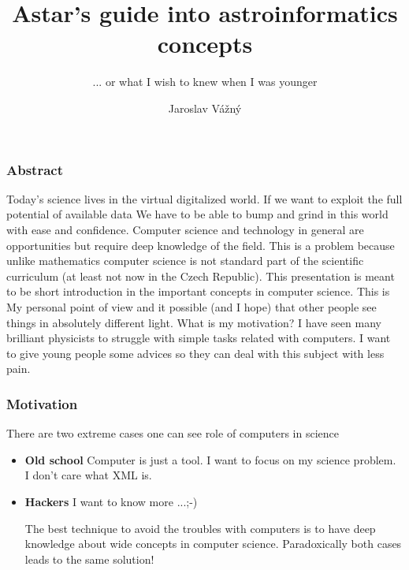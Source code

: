 \documentclass[fleqn]{beamer}
\title[VO \& Data Mining] %
{Astar's  guide into astroinformatics concepts}
\subtitle{... or what I wish to knew when I was younger} %
\author[Jaroslav Vážný] %
{Jaroslav Vážný }
\institute[Universities of Somewhere and Elsewhere] %
{

    Masarykova univerzita

}
\begin{document}
 




\begin{frame}
  \titlepage
\end{frame}




\begin{frame}\frametitle{Abstract}
\small{Today's science lives in the virtual digitalized world. If we
  want to exploit the full potential of available data We have to be
  able to bump and grind in this world with ease and confidence.
  Computer science and technology in general are opportunities but
  require deep knowledge of the field.  This is a problem because
  unlike mathematics computer science is not standard part of the
  scientific curriculum (at least not now in the Czech Republic). This
  presentation is meant to be short introduction in the important
  concepts in computer science.  This is My personal point of view and
  it possible (and I hope) that other people see things in absolutely
  different light. What is my motivation? I have seen many brilliant
  physicists to struggle with simple tasks related with computers. I
  want to give young people some advices so they can deal with this
  subject with less pain.}



\end{frame}


\begin{frame}\frametitle{Motivation}
  There are two extreme cases one can see role of computers in science
  \begin{itemize}
  \item \textbf{Old school} Computer is just a tool. I want to focus
    on my science problem. I don't care what XML is.
  \item \textbf{Hackers} I want to know more ...;-) 

\bigskip

The best technique to avoid the troubles with computers is to have deep
knowledge about wide concepts in computer science. Paradoxically both
cases leads to the same solution!
  \end{itemize}
\end{frame}
\end{document}
